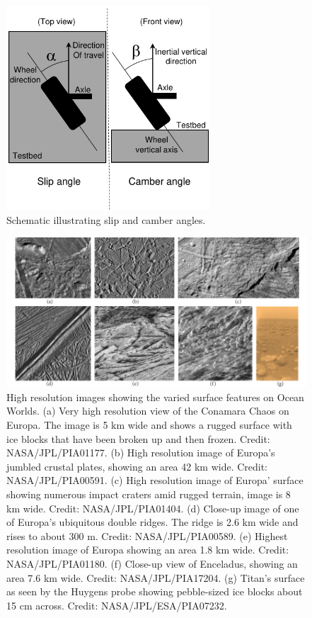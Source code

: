 \documentclass{article}
\begin{document}
\begin{figure}[hbt!]
\centering
\includegraphics[width=3.00in]{general-images/slip-camber-schematic.pdf}
\caption{Schematic illustrating slip and camber angles.}
\label{fig:slip-camber-schmatic}
\end{figure}

\begin{figure}[hbt!]
\centering
\includegraphics[width=6.5in]{general-images/icy-moon-surfaces.pdf}
\caption{High resolution images showing the varied surface features on Ocean Worlds. (a) Very high resolution view of the Conamara Chaos on Europa. The image is 5 km wide and shows a rugged surface with ice blocks that have been broken up and then frozen. Credit: NASA/JPL/PIA01177. (b) High resolution image of Europa's jumbled crustal plates, showing an area 42 km wide. Credit: NASA/JPL/PIA00591. (c) High resolution image of Europa' surface showing numerous impact craters amid rugged terrain, image is 8 km wide. Credit: NASA/JPL/PIA01404. (d) Close-up image of one of Europa's ubiquitous double ridges. The ridge is 2.6 km wide and rises to about 300 m. Credit: NASA/JPL/PIA00589. (e) Highest resolution image of Europa showing an area 1.8 km wide. Credit: NASA/JPL/PIA01180. (f) Close-up view of Enceladus, showing an area 7.6 km wide. Credit: NASA/JPL/PIA17204. (g) Titan's surface as seen by the Huygens probe showing pebble-sized ice blocks about 15 cm across. Credit: NASA/JPL/ESA/PIA07232.}
\label{fig:icy-moon-photos-and-earth-analogs}
\end{figure}
\end{document}
